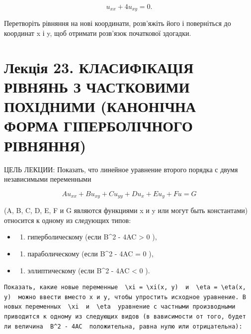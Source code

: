 \documentclass[
  ukrainian,
]{article}
\providecommand{\tightlist}{%
  \setlength{\itemsep}{0pt}\setlength{\parskip}{0pt}}
\begin{document}
\[u_{xx} + 4u_{xy} = 0.\]

Перетворіть рівняння на нові координати, розв'яжіть його і поверніться
до координат x і y, щоб отримати розв'язок початкової здогадки.

\section{Лекція 23. КЛАСИФІКАЦІЯ РІВНЯНЬ З ЧАСТКОВИМИ ПОХІДНИМИ
(КАНОНІЧНА ФОРМА ГІПЕРБОЛІЧНОГО
РІВНЯННЯ)}\label{ux43bux435ux43aux446ux456ux44f-23.-ux43aux43bux430ux441ux438ux444ux456ux43aux430ux446ux456ux44f-ux440ux456ux432ux43dux44fux43dux44c-ux437-ux447ux430ux441ux442ux43aux43eux432ux438ux43cux438-ux43fux43eux445ux456ux434ux43dux438ux43cux438-ux43aux430ux43dux43eux43dux456ux447ux43dux430-ux444ux43eux440ux43cux430-ux433ux456ux43fux435ux440ux431ux43eux43bux456ux447ux43dux43eux433ux43e-ux440ux456ux432ux43dux44fux43dux43dux44f}

ЦЕЛЬ ЛЕКЦИИ: Показать, что линейное уравнение второго порядка с двумя
независимыми переменными

\[
Au_{xx} + Bu_{xy} + Cu_{yy} + Du_x + Eu_y + Fu = G
\]

(A, B, C, D, E, F и G являются функциями x и y или могут быть
константами) относится к одному из следующих типов:

\begin{itemize}
\tightlist
\item
  \begin{enumerate}
  \def\labelenumi{\arabic{enumi})}
  \tightlist
  \item
    гиперболическому (если B\^{}2 - 4AC \textgreater{} 0 ),
  \end{enumerate}
\item
  \begin{enumerate}
  \def\labelenumi{\arabic{enumi})}
  \setcounter{enumi}{1}
  \tightlist
  \item
    параболическому (если B\^{}2 - 4AC = 0 ),
  \end{enumerate}
\item
  \begin{enumerate}
  \def\labelenumi{\arabic{enumi})}
  \setcounter{enumi}{2}
  \tightlist
  \item
    эллиптическому (если B\^{}2 - 4AC \textless{} 0 ).
  \end{enumerate}
\end{itemize}

\begin{verbatim}
Показать, какие новые переменные  \xi = \xi(x, y)  и  \eta = \eta(x, y)  можно ввести вместо x и y, чтобы упростить исходное уравнение. В новых переменных  \xi  и  \eta  уравнение с частными производными приводится к одному из следующих видов (в вависимости от того, будет ли величина  B^2 - 4AC  положительна, равна нулю или отрицательна):
\end{verbatim}
\end{document}
